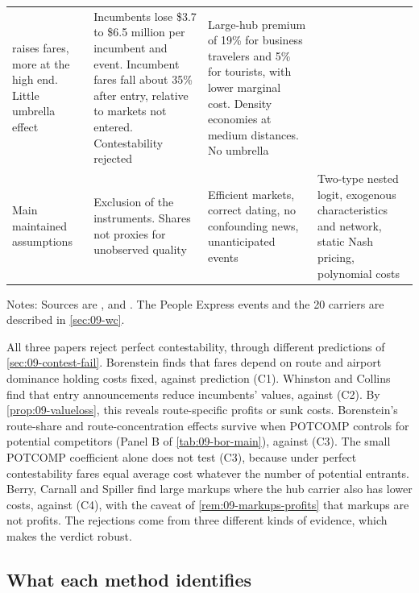 \begin{table}[htbp]
\begin{threeparttable}
\begin{tabularx}{\textwidth}{@{}>{\raggedright\arraybackslash}p{1.9cm}>{\raggedright\arraybackslash}X
  >{\raggedright\arraybackslash}X>{\raggedright\arraybackslash}X@{}}
  raises fares, more at the high end. Little umbrella effect & Incumbents lose \$3.7 to \$6.5 million per
  incumbent and event. Incumbent fares fall about 35\% after entry, relative to markets not entered.
  Contestability rejected & Large-hub
  premium of 19\% for business travelers and 5\% for tourists, with lower marginal cost. Density economies
  at medium distances. No umbrella \\
\addlinespace
Main maintained assumptions & Exclusion of the instruments. Shares not proxies for unobserved quality &
  Efficient markets, correct dating, no confounding news, unanticipated events & Two-type nested logit,
  exogenous characteristics and network, static Nash pricing, polynomial costs \\
\bottomrule
\end{tabularx}
\begin{tablenotes}\footnotesize
\item Notes: Sources are \citet[Tables 2--4]{Borenstein1989}, \citet[Tables 1 and 3]{WhinstonCollins1992}
and \citet[Tables 1 and 5--7]{BerryCarnallSpiller1996}. The People Express events and the 20 carriers are
described in \cref{sec:09-wc}.
\end{tablenotes}
\end{threeparttable}
\end{table}

All three papers reject perfect contestability, through different predictions of \cref{sec:09-contest-fail}.
Borenstein finds that fares depend on route and airport dominance holding costs fixed, against prediction
(C1). Whinston and Collins find that entry announcements reduce incumbents' values, against (C2). By
\cref{prop:09-valueloss}, this reveals route-specific profits or sunk costs. Borenstein's route-share and
route-concentration effects survive when POTCOMP controls for potential competitors (Panel B of
\cref{tab:09-bor-main}), against (C3). The small POTCOMP coefficient alone does not test (C3), because under
perfect contestability fares equal average cost whatever the number of potential entrants. Berry, Carnall and Spiller find large markups where the hub carrier
also has lower costs, against (C4), with the caveat of \cref{rem:09-markups-profits} that markups are not
profits. The rejections come from three different kinds of evidence, which makes the verdict robust.

\subsection{What each method identifies}\label{sec:09-synthesis-identify}

